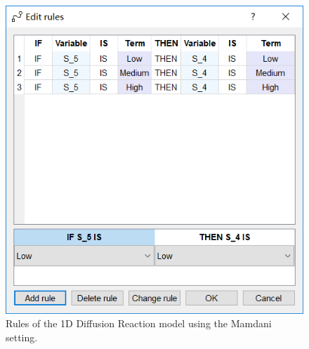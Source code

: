 \documentclass[journal,a4paper,onecolumn]{article}
\begin{document}
\begin{figure}[!hbt]
	\begin{center}
		\includegraphics[width=\columnwidth]{fig33}
		\caption{Rules of the 1D Diffusion Reaction model using the Mamdani setting.}
		\label{fig:Rules of 1D Diffusion Reaction using Mamdani.}
	\end{center}
\end{figure}
\end{document}
